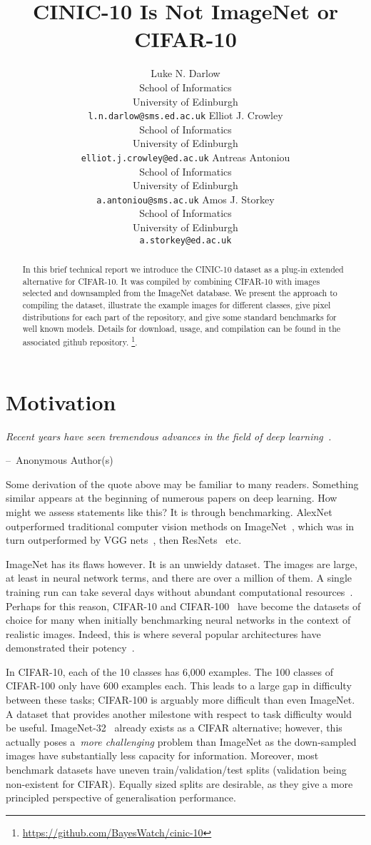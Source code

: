 \documentclass[coverpage]{Style/inftechrep}
\title{CINIC-10 Is Not ImageNet or CIFAR-10}
\author{
  Luke N. Darlow\\
  School of Informatics\\
  University of Edinburgh\\
  \texttt{l.n.darlow@sms.ed.ac.uk}
   \And
  Elliot J. Crowley\\
  School of Informatics\\
  University of Edinburgh\\
  \texttt{elliot.j.crowley@ed.ac.uk}
  \AND
     Antreas Antoniou\\
  School of Informatics\\
  University of Edinburgh\\
  \texttt{a.antoniou@sms.ac.uk} 
\And
     Amos J. Storkey\\
  School of Informatics\\
  University of Edinburgh\\
  \texttt{a.storkey@ed.ac.uk}
  
}
\makeatletter
\newenvironment{chapquote}[2][2em]
  {\setlength{\@tempdima}{#1}\def\chapquote@author{#2}\parshape 1 \@tempdima \dimexpr\textwidth-2\@tempdima\relax \itshape}
  {\par\normalfont\hfill--\ \chapquote@author\hspace*{\@tempdima}\par\bigskip}
\makeatother
\begin{document}
\maketitle
 
\begin{abstract}
In this brief technical report we introduce the CINIC-10 dataset as a plug-in extended alternative for CIFAR-10. It was compiled by combining CIFAR-10 with images selected and downsampled from the ImageNet database. We present the approach to compiling the dataset, illustrate the example images for different classes, give pixel distributions for each part of the repository, and give some standard benchmarks for well known models. Details for download, usage, and compilation can be found in the associated github repository. \footnote{\label{foot:url}\url{https://github.com/BayesWatch/cinic-10}}.
\end{abstract}

\section{Motivation}

\begin{chapquote}{Anonymous Author(s)}
Recent years have seen tremendous advances in the field of deep learning~\citep{lecun2015deep}.
\end{chapquote}

Some derivation of the quote above may be familiar to many readers. Something similar appears at the beginning of numerous papers on deep learning. How might we assess statements like this? It is through benchmarking. AlexNet~\citep{alexnet} outperformed traditional computer vision methods on ImageNet~\citep{ILSVRC15}, which was in turn outperformed by VGG nets~\citep{vgg}, then ResNets~\citep{he2016deep} etc.\

ImageNet has its flaws however. It is an unwieldy dataset. The images are large, at least in neural network terms, and there are over a million of them. A single training run can take several days without abundant computational resources~\citep{imagenet1hr}. Perhaps for this reason, CIFAR-10 and CIFAR-100~\citep{cifar} have become the datasets of choice for many when initially benchmarking neural networks in the context of realistic images. Indeed, this is where several popular architectures have demonstrated their potency~\citep{dense,shakeshake}. 

In CIFAR-10, each of the 10 classes has 6,000 examples. The 100 classes of CIFAR-100 only have 600 examples each. This leads to a large gap in difficulty between these tasks; CIFAR-100 is arguably more difficult than even ImageNet. A dataset that provides another milestone with respect to task difficulty would be useful. ImageNet-32~\citep{imagenet32} already exists as a CIFAR alternative; however, this actually poses a~{\it more challenging} problem than ImageNet as the down-sampled images have substantially less capacity for information. Moreover, most benchmark datasets have uneven train/validation/test splits (validation being non-existent for CIFAR). Equally sized splits are desirable, as they give a more principled perspective of generalisation performance. 
\end{document}
